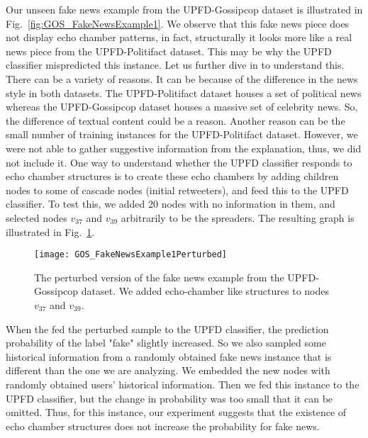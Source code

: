Our unseen fake news example from the UPFD-Gossipcop dataset is illustrated in Fig.~\ref{fig:GOS_FakeNewsExample1}. We observe that this fake news piece does not display echo chamber patterns, in fact, structurally it looks more like a real news piece from the UPFD-Politifact dataset. This may be why the UPFD classifier mispredicted this instance. Let us further dive in to understand this. There can be a variety of reasons. It can be because of the difference in the news style in both datasets. The UPFD-Politifact dataset houses a set of political news whereas the UPFD-Gossipcop dataset houses a massive set of celebrity news. So, the difference of textual content could be a reason. Another reason can be the small number of training instances for the UPFD-Politifact dataset. However, we were not able to gather suggestive information from the explanation, thus, we did not include it. One way to understand whether the UPFD classifier responds to echo chamber structures is to create these echo chambers by adding children nodes to some of cascade nodes (initial retweeters), and feed this to the UPFD classifier. To test this, we added 20 nodes with no information in them, and selected nodes $v_{37}$ and $v_{39}$ arbitrarily to be the spreaders. The resulting graph is illustrated in Fig.~\ref{fig:GOS_FakeNewsExample1Perturbed}.
\begin{figure}
    \centering
    \texttt{[image: GOS\_FakeNewsExample1Perturbed]}
    \caption[The perturbed version of the fake news example from the UPFD-Gossipcop dataset.]{The perturbed version of the fake news example from the UPFD-Gossipcop dataset. We added echo-chamber like structures to nodes $v_{37}$ and $v_{39}$.}
    \label{fig:GOS_FakeNewsExample1Perturbed}
\end{figure}
When the fed the perturbed sample to the UPFD classifier, the prediction probability of the label "fake" slightly increased. So we also sampled some historical information from a randomly obtained fake news instance that is different than the one we are analyzing. We embedded the new nodes with randomly obtained users' historical information. Then we fed this instance to the UPFD classifier, but the change in probability was too small that it can be omitted. Thus, for this instance, our experiment suggests that the existence of echo chamber structures does not increase the probability for fake news.\\
